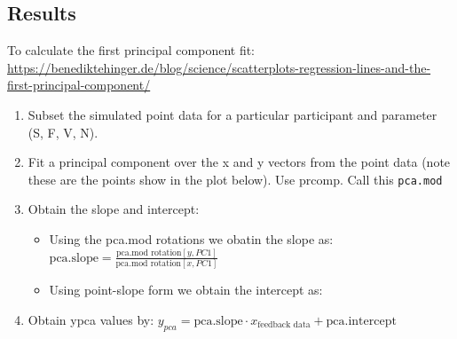 \documentclass[print]{nuthesis}
\providecommand{\tightlist}{%
  \setlength{\itemsep}{0pt}\setlength{\parskip}{0pt}}
\begin{document}
\hypertarget{results-1}{%
\subsection{Results}\label{results-1}}

To calculate the first principal component fit: \url{https://benediktehinger.de/blog/science/scatterplots-regression-lines-and-the-first-principal-component/}

\begin{enumerate}
\def\labelenumi{\arabic{enumi}.}
\tightlist
\item
  Subset the simulated point data for a particular participant and parameter (S, F, V, N).
\item
  Fit a principal component over the x and y vectors from the point data (note these are the points show in the plot below). Use prcomp. Call this \texttt{pca.mod}
\item
  Obtain the slope and intercept:

  \begin{itemize}
  \tightlist
  \item
    Using the pca.mod rotations we obatin the slope as: \(\text{pca.slope} = \frac{\text{pca.mod rotation}[y,PC1]}{\text{pca.mod rotation}[x,PC1]}\)
  \item
    Using point-slope form we obtain the intercept as:
  \end{itemize}
\item
  Obtain ypca values by: \(y_{pca} = \text{pca.slope} \cdot x_{\text{feedback data}} + \text{pca.intercept}\)
\end{enumerate}
\end{document}
